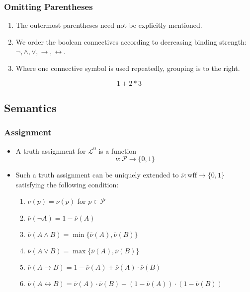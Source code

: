 \documentclass[UTF8,aspectratio=43,11pt,colorlinks,compress,openany]{beamer}%
\begin{document}
\begin{frame}\frametitle{Omitting Parentheses}
	\begin{enumerate}
		\item The outermost parentheses need not be explicitly mentioned.
		\item We order the boolean connectives according to decreasing binding strength: $\neg, \wedge, \vee, \to, \leftrightarrow$.
		\item Where one connective symbol is used repeatedly, grouping is to the right.
	\end{enumerate}
	\[1+2*3\]
\end{frame}

\subsection{Semantics}

\begin{frame}\frametitle{Assignment}
	\begin{itemize}
		\item A truth assignment for $\mathscr{L}^0$ is a function
		\[\nu:\mathcal{P}\to\{0,1\}\]
		\item Such a truth assignment can be uniquely extended to $\overline{\nu}:\mathrm{wff}\to\{0,1\}$ satisfying the following condition:\\
		\begin{enumerate}
			\item $\overline{\nu}(p)=\nu(p)$ for $p\in\mathcal{P}$
			\item $\overline{\nu}(\neg A)=1-\overline{\nu}(A)$
			\item $\overline{\nu}(A\wedge B)=\min\{\overline{\nu}(A),\overline{\nu}(B)\}$
			\item $\overline{\nu}(A\vee B)=\max\{\overline{\nu}(A),\overline{\nu}(B)\}$
			\item $\overline{\nu}(A\to B)=1-\overline{\nu}(A)+\overline{\nu}(A)\cdot\overline{\nu}(B)$
			\item $\overline{\nu}(A\leftrightarrow B)=\overline{\nu}(A)\cdot\overline{\nu}(B)+(1-\overline{\nu}(A))\cdot(1-\overline{\nu}(B))$
		\end{enumerate}
	\end{itemize}
\end{frame}
\end{document}
